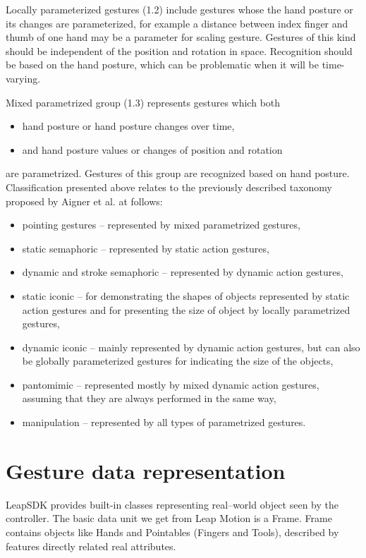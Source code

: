 Locally parameterized gestures (1.2) include gestures whose the hand posture or its changes are parameterized, for example a distance between index finger and thumb of one hand may be a parameter for scaling gesture. Gestures of this kind should be independent of the position and rotation in space. Recognition should be based on the hand posture, which can be problematic when it will be time-varying.

Mixed parametrized group (1.3) represents gestures which both
\begin{itemize}
\item hand posture or hand posture changes over time,
\item and hand posture values or changes of position and rotation
\end{itemize}
are parametrized. Gestures of this group are recognized based on hand posture.
Classification presented above relates to the previously described taxonomy proposed by Aigner et al. at follows:
\begin{itemize}
\item pointing gestures -- represented by mixed parametrized gestures,
\item static semaphoric -- represented by static action gestures,
\item dynamic and stroke semaphoric -- represented by dynamic action gestures,
\item static iconic -- for demonstrating the shapes of objects represented by static action gestures and for presenting the size of object by locally parametrized gestures,
\item dynamic iconic -- mainly represented by dynamic action gestures, but can also be globally parameterized gestures for indicating the size of the objects,
\item pantomimic -- represented mostly by mixed dynamic action gestures, assuming that they are always performed in the same way,
\item manipulation -- represented by all types of parametrized gestures.
\end{itemize}

\section{Gesture data representation}

LeapSDK provides built-in classes representing real--world object seen by the controller. The basic data unit we get from Leap Motion is a Frame. Frame contains objects like Hands and Pointables (Fingers and Tools), described by features directly related real attributes.

